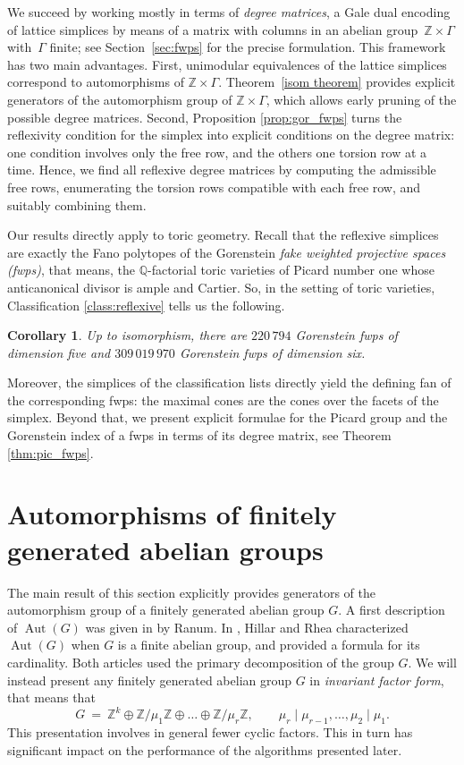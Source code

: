 \documentclass{amsart}
\DeclareMathOperator{\Aut}{Aut}
\newcommand{\Z}{\mathbb{Z}}
\newcommand{\Q}{\mathbb{Q}}
\newtheorem{corollary}[lem]{Corollary}
\theoremstyle{definition}
\begin{document}
We succeed by working mostly in terms of \emph{degree matrices}, a Gale dual encoding of
lattice simplices by means of a matrix with columns in an abelian group~$\Z \times \Gamma$ with~$\Gamma$ finite; see Section~\ref{sec:fwps} for the precise formulation.
This framework has two main advantages. First, unimodular equivalences of the lattice simplices correspond to automorphisms of
$\Z \times \Gamma$. Theorem~\ref{isom theorem} provides explicit generators of the automorphism
group of $\Z \times \Gamma$, which allows early pruning of the possible degree matrices. Second, Proposition \ref{prop:gor_fwps} turns the reflexivity condition for the simplex into explicit conditions on the degree matrix: one condition involves only the free row, and the others one torsion row at a time. Hence, we find all reflexive degree matrices by computing the admissible free rows, enumerating the torsion rows compatible with each free row, and suitably combining them.

Our results directly apply to toric geometry. Recall that the reflexive simplices are exactly the Fano polytopes
of the Gorenstein \emph{fake weighted projective spaces (fwps)}, that means, the $\Q$-factorial toric
varieties of Picard number one whose anticanonical divisor is ample and Cartier.
So, in the setting of toric varieties, Classification \ref{class:reflexive} tells us the
following.


\begin{corollary}\label{corclass}
Up to isomorphism, there are $220 \, 794$ Gorenstein fwps of dimension five
and $309 \, 019 \, 970$ Gorenstein fwps of dimension six.
\end{corollary}

Moreover, the simplices of the classification lists directly yield the defining fan of
the corresponding fwps: the maximal cones are the cones over the facets of the simplex.
Beyond that, we present explicit formulae for the Picard group and
the Gorenstein index of a fwps in terms of its degree matrix, see Theorem \ref{thm:pic_fwps}.

\tableofcontents

\section{Automorphisms of finitely generated abelian groups}\label{sec:groups}

The main result of this section explicitly provides
generators of the automorphism
group of a finitely generated abelian group $G$. A first description of $\Aut(G)$ was given in \cite{R} by Ranum. In \cite{HR}, Hillar and Rhea characterized $\Aut(G)$ when $G$ is a finite abelian group, and provided a formula for its cardinality. Both articles used the primary decomposition of the group $G$. We will instead present any finitely generated abelian group $G$ in 
\emph{invariant factor form}, that means that 
\[
G
\ = \
\Z^k \oplus \Z/\mu_1\Z \oplus \ldots \oplus \Z/\mu_r\Z,
\qquad
\mu_r \mid \mu_{r-1}, \ldots, \mu_2 \mid \mu_1.
\]
This presentation involves in general fewer cyclic factors. This in turn has significant impact on the performance of the algorithms presented later.  
\end{document}
